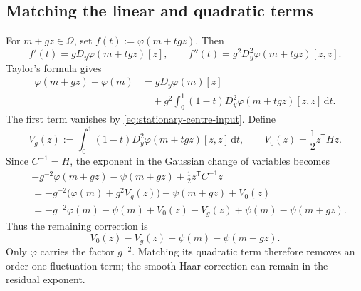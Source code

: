 \documentclass[10pt,reqno]{amsart}
\theoremstyle{definition}
\theoremstyle{remark}
\numberwithin{equation}{section}
\numberwithin{figure}{section}
\newcommand{\dd}{\mathrm d}
\begin{document}
\subsection{Matching the linear and quadratic terms}
For $m+gz\in\Omega$, set $f(t):=\varphi(m+tgz)$. Then
\begin{equation}\label{eq:line-derivatives}
f'(t)=gD_y\varphi(m+tgz)[z],\qquad
f''(t)=g^2D_y^2\varphi(m+tgz)[z,z].
\end{equation}
Taylor's formula gives
\begin{equation}\label{eq:line-taylor-formula}
\begin{aligned}
\varphi(m+gz)-\varphi(m)
&=gD_y\varphi(m)[z]\\
&\quad+g^2\int_0^1(1-t)D_y^2\varphi(m+tgz)[z,z]\,\dd t.
\end{aligned}
\end{equation}
The first term vanishes by \eqref{eq:stationary-centre-input}. Define
\begin{equation}\label{eq:taylor-quadratic-integral}
V_g(z):=\int_0^1(1-t)D_y^2\varphi(m+tgz)[z,z]\,\dd t,
\qquad V_0(z)=\frac12z^{\mathsf T}Hz.
\end{equation}
Since $C^{-1}=H$, the exponent in the Gaussian change of variables becomes
\begin{equation}\label{eq:matched-exponent}
\begin{aligned}
&-g^{-2}\varphi(m+gz)-\psi(m+gz)
+\frac12z^{\mathsf T}C^{-1}z\\
&=-g^{-2}\bigl(\varphi(m)+g^2V_g(z)\bigr)-\psi(m+gz)+V_0(z)\\
&=-g^{-2}\varphi(m)-\psi(m)
+V_0(z)-V_g(z)+\psi(m)-\psi(m+gz).
\end{aligned}
\end{equation}
Thus the remaining correction is
\begin{equation}\label{eq:remaining-exponent}
V_0(z)-V_g(z)+\psi(m)-\psi(m+gz).
\end{equation}
Only $\varphi$ carries the factor $g^{-2}$. Matching its quadratic term
therefore removes an order-one fluctuation term; the smooth Haar correction
can remain in the residual exponent.
\end{document}
